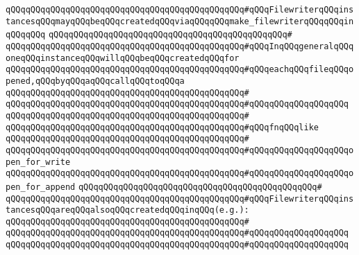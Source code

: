 \verb|qQQqqQQqqQQqqQQqqQQqqQQqqQQqqQQqqQQqqQQqqQQqqQQq#qQQqFilewriterqQQqinstancesqQQqmayqQQqbeqQQqcreatedqQQqviaqQQqqQQqmake_filewriterqQQqqQQqinqQQqqQQq|\newline
\verb|qQQqqQQqqQQqqQQqqQQqqQQqqQQqqQQqqQQqqQQqqQQqqQQq#|\newline
\verb|qQQqqQQqqQQqqQQqqQQqqQQqqQQqqQQqqQQqqQQqqQQqqQQq#qQQqInqQQqgeneralqQQqoneqQQqinstanceqQQqwillqQQqbeqQQqcreatedqQQqfor|\newline
\verb|qQQqqQQqqQQqqQQqqQQqqQQqqQQqqQQqqQQqqQQqqQQqqQQq#qQQqeachqQQqfileqQQqopened,qQQqbyqQQqaqQQqcallqQQqtoqQQqa|\newline
\verb|qQQqqQQqqQQqqQQqqQQqqQQqqQQqqQQqqQQqqQQqqQQqqQQq#|\newline
\verb|qQQqqQQqqQQqqQQqqQQqqQQqqQQqqQQqqQQqqQQqqQQqqQQq#qQQqqQQqqQQqqQQqqQQq|\newline
\verb|qQQqqQQqqQQqqQQqqQQqqQQqqQQqqQQqqQQqqQQqqQQqqQQq#|\newline
\verb|qQQqqQQqqQQqqQQqqQQqqQQqqQQqqQQqqQQqqQQqqQQqqQQq#qQQqfnqQQqlike|\newline
\verb|qQQqqQQqqQQqqQQqqQQqqQQqqQQqqQQqqQQqqQQqqQQqqQQq#|\newline
\verb|qQQqqQQqqQQqqQQqqQQqqQQqqQQqqQQqqQQqqQQqqQQqqQQq#qQQqqQQqqQQqqQQqqQQqopen_for_write|\newline
\verb|qQQqqQQqqQQqqQQqqQQqqQQqqQQqqQQqqQQqqQQqqQQqqQQq#qQQqqQQqqQQqqQQqqQQqopen_for_append|\newline
\verb|qQQqqQQqqQQqqQQqqQQqqQQqqQQqqQQqqQQqqQQqqQQqqQQq#|\newline
\verb|qQQqqQQqqQQqqQQqqQQqqQQqqQQqqQQqqQQqqQQqqQQqqQQq#qQQqFilewriterqQQqinstancesqQQqareqQQqalsoqQQqcreatedqQQqinqQQq(e.g.):|\newline
\verb|qQQqqQQqqQQqqQQqqQQqqQQqqQQqqQQqqQQqqQQqqQQqqQQq#|\newline
\verb|qQQqqQQqqQQqqQQqqQQqqQQqqQQqqQQqqQQqqQQqqQQqqQQq#qQQqqQQqqQQqqQQqqQQq|\newline
\verb|qQQqqQQqqQQqqQQqqQQqqQQqqQQqqQQqqQQqqQQqqQQqqQQq#qQQqqQQqqQQqqQQqqQQq|\newline
\newline
